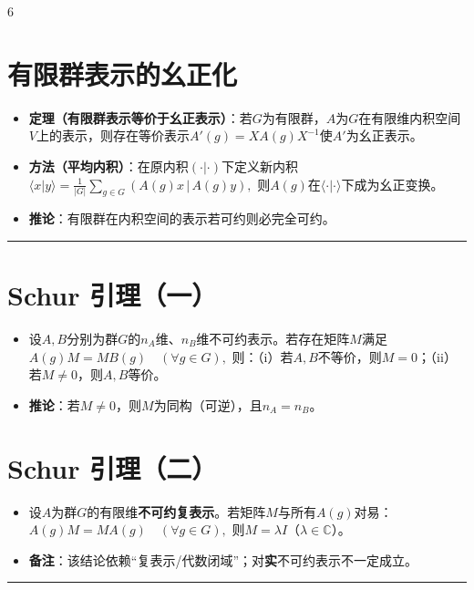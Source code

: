 \documentclass[landscape]{article}
\begin{document}
\begin{multicols*}{6}
\section*{有限群表示的幺正化}
\begin{itemize}
  \item \textbf{定理（有限群表示等价于幺正表示）}：若$G$为有限群，$A$为$G$在有限维内积空间$V$上的表示，则存在等价表示$A'(g)=X A(g) X^{-1}$使$A'$为幺正表示。
  \item \textbf{方法（平均内积）}：在原内积$(\cdot|\cdot)$下定义新内积
  \\
  $
  \langle x|y\rangle=\frac{1}{|G|}\sum_{g\in G} (A(g)x\,|\,A(g)y),
  $
  则$A(g)$在$\langle\cdot|\cdot\rangle$下成为幺正变换。
  \item \textbf{推论}：{\color{red}有限群在内积空间的表示若可约则必完全可约}。
\end{itemize}
\noindent\textcolor{red}{\rule{\linewidth}{1pt}}
\section*{Schur 引理（一）}
\begin{itemize}
  \item 设$A,B$分别为群$G$的$n_A$维、$n_B$维不可约表示。若存在矩阵$M$满足
  \\
  $
  A(g)M=MB(g)\quad (\forall g\in G),
  $
  则：（i）若$A,B$不等价，则$M=0$；（ii）若$M\neq0$，则$A,B$等价。
  \item \textbf{推论}：若$M\neq0$，则$M$为同构（可逆），且$n_A=n_B$。
\end{itemize}

\section*{Schur 引理（二）}
\begin{itemize}
  \item 设$A$为群$G$的有限维\textbf{不可约复表示}。若矩阵$M$与所有$A(g)$对易：
  \\
  $
  A(g)M=MA(g)\quad (\forall g\in G),
  $
  则$M=\lambda I$（$\lambda\in\mathbb{C}$）。
  \item \textbf{备注}：该结论依赖“复表示/代数闭域”；对\textbf{实}不可约表示不一定成立。
\end{itemize}
\noindent\textcolor{red}{\rule{\linewidth}{1pt}}

\end{multicols*}
\end{document}
